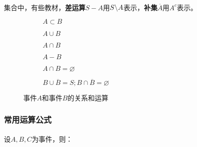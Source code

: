 \paragraph{}
集合中，有些教材，\textbf{差运算}$S - A$用$S \symbol{92} A$表示，\textbf{补集}$\overline{A}$用$A^{c}$表示。

\begin{figure}[H]
\centering
  \begin{subfigure}[t]{0.3\linewidth}
    \centering
      
      \caption{$A \subset B$}
      \label{1_A_subset_B}
  \end{subfigure}
  \begin{subfigure}[t]{0.3\linewidth}
    \centering
      
      \caption{$A \cup B$}
      \label{1_A_cup_B}
  \end{subfigure}
  \begin{subfigure}[t]{0.3\linewidth}
    \centering
      
      \caption{$A \cap B$}
      \label{1_A_cap_B}
  \end{subfigure}

  \bigskip %
  \begin{subfigure}[b]{0.3\linewidth}
    \centering
      
      \caption{$A - B$}
      \label{1_A_diffence_B}
  \end{subfigure}
  \begin{subfigure}[b]{0.3\linewidth}
    \centering
      
      \caption{$A \cap B = \varnothing$}
      \label{1_A_cap_nothing_B}
  \end{subfigure}
  \begin{subfigure}[b]{0.3\linewidth}
    \centering
      
      \caption{$B \cup \overline{B} = S; B \cap \overline{B} = \varnothing$}
      \label{1_B_complement}
  \end{subfigure}
  \caption{事件$A$和事件$B$的关系和运算}
  \label{事件A和事件B的关系和运算}
\end{figure}

\subsubsection{常用运算公式}
\paragraph{}
设$A, B, C$为事件，则：

